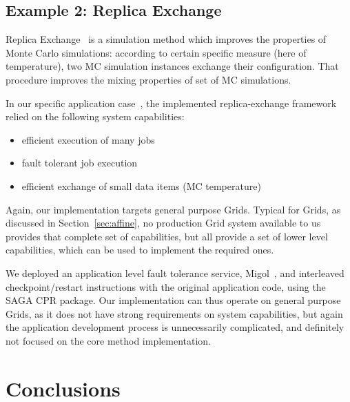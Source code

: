 \documentclass{article}
\newenvironment{shortlist}{
  \vspace*{-0.5em}
  \begin{itemize}
  \setlength{\itemsep}{-0.3em}
}{
  \end{itemize}
  \vspace*{-0.5em}
}
\newcommand{\up}{\vspace*{-1em}}
\begin{document}
 \up
 \subsection{Example 2: Replica Exchange}

 Replica Exchange~\cite{repex} is a simulation method which improves
 the properties of Monte Carlo simulations: according to certain
 specific measure (here of temperature), two MC simulation instances
 exchange their configuration.  That procedure improves the mixing
 properties of set of MC
 simulations.

 In our specific application case~\cite{saga-migol-paper}, the
 implemented replica-exchange framework relied on the following system
 capabilities: 

  \begin{shortlist}
   \item efficient execution of many jobs
   \item fault tolerant job execution
   \item efficient exchange of small data items (MC temperature)
  \end{shortlist}

  Again, our implementation targets general purpose Grids.
  Typical for Grids, as discussed in Section~\ref{sec:affine},
  no production Grid system available to us provides that
  complete set of capabilities, but all provide a set of lower
  level capabilities, which can be used to implement the
  required ones.

  We deployed an application level fault tolerance service,
  Migol~\cite{migol}, and interleaved checkpoint/restart
  instructions with the original application code, using the
  SAGA CPR package.  Our implementation can thus operate on
  general purpose Grids, as it does not have strong requirements
  on system capabilities, but again the application development
  process is unnecessarily complicated, and definitely not
  focused on the core method implementation.



\section{Conclusions}
\label{sec:conclusion}
\end{document}
